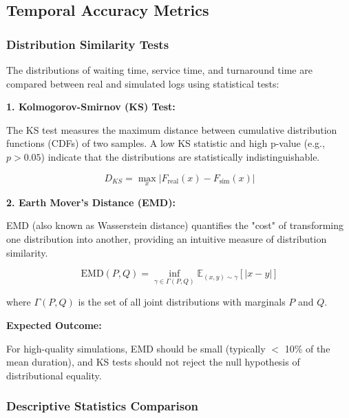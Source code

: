     \subsection{Temporal Accuracy Metrics}

        \subsubsection{Distribution Similarity Tests}
        
        The distributions of waiting time, service time, and turnaround time are compared between real and simulated logs using statistical tests:
        
        \textbf{1. Kolmogorov-Smirnov (KS) Test:}
        
        The KS test measures the maximum distance between cumulative distribution functions (CDFs) of two samples. A low KS statistic and high p-value (e.g., $p > 0.05$) indicate that the distributions are statistically indistinguishable.
        
        \begin{equation}
            D_{KS} = \max_x |F_{\text{real}}(x) - F_{\text{sim}}(x)|
        \end{equation}
        
        \textbf{2. Earth Mover's Distance (EMD):}
        
        EMD (also known as Wasserstein distance) quantifies the "cost" of transforming one distribution into another, providing an intuitive measure of distribution similarity.
        
        \begin{equation}
            \text{EMD}(P, Q) = \inf_{\gamma \in \Gamma(P, Q)} \mathbb{E}_{(x, y) \sim \gamma} [|x - y|]
        \end{equation}
        
        where $\Gamma(P, Q)$ is the set of all joint distributions with marginals $P$ and $Q$.
        
        \textbf{Expected Outcome:}
        
        For high-quality simulations, EMD should be small (typically $<$ 10\% of the mean duration), and KS tests should not reject the null hypothesis of distributional equality.

        \subsubsection{Descriptive Statistics Comparison}
        
